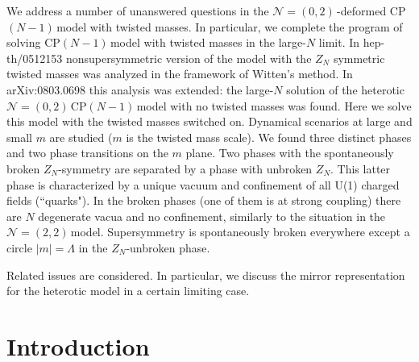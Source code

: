 \documentclass[epsfig,12pt]{article}
\newcommand{\ntt}{${\mathcal N}=(2,2)\,$}
\newcommand{\nzt}{${\mathcal N}=(0,2)\,$}
\newcommand{\cpn}{CP$(N-1)\,$}
\newcommand{\zn}{$Z_N$}
\begin{document}
\begin{titlepage}
\hspace{0.3cm}
We address a number of unanswered questions in the \nzt-deformed \cpn model with
twisted masses.  In particular, we
complete the program of solving \cpn model with twisted masses in the large-$N$
limit. In hep-th/0512153 nonsupersymmetric version of the model with the $Z_N$
symmetric twisted masses was analyzed in the framework of Witten's method. In arXiv:0803.0698 
this analysis was extended:  the 
large-$N$ solution of the heterotic \nzt \cpn model with no twisted masses was found.
Here we solve this  model with the twisted
masses switched on. Dynamical scenarios at large and small $m$ are studied
($m$ is the twisted mass scale).
We found three distinct phases and two phase transitions on the $m$ plane. 
Two phases with the spontaneously broken 
\zn-symmetry are separated by a phase with unbroken \zn. This latter phase is characterized by a unique vacuum and confinement of all U(1) charged fields (``quarks").
In the broken phases (one of them is at strong coupling) there are $N$ degenerate vacua
and no confinement, similarly to the situation in the \ntt model.
Supersymmetry is spontaneously broken everywhere except a circle $|m|=\Lambda$ in the \zn-unbroken phase. 

Related issues are considered. In particular,
we discuss the mirror representation for the heterotic model in a certain limiting case.

\vspace{2cm}




\end{titlepage}

\newpage

\tableofcontents

\newpage

\section{Introduction}
\setcounter{equation}{0}
\end{document}
